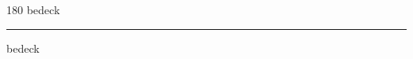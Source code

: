 
\begin{frame}
\begin{center}
\begin{turn}{180}
{\fontsize{2.5cm}{1em}\selectfont bedeck}
\end{turn}
\vspace{1em}\par  
\hrule
\vspace{1em}\par  
{\fontsize{2.5cm}{1em}\selectfont bedeck}
\end{center}
\end{frame}
